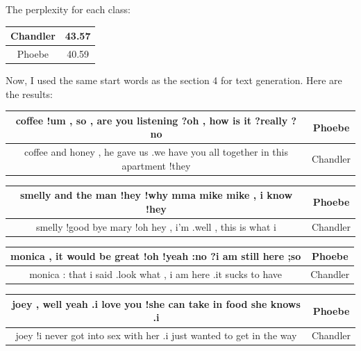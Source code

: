 \documentclass{article}
\begin{document}
\par The perplexity for each class:

\begin{center}
\begin{tabular}{ |c|c| } 
 \hline
 Chandler & 43.57  \\ 
 \hline
 Phoebe & 40.59 \\ 
 \hline
\end{tabular}
\end{center}

\par Now, I used the same start words as the section 4 for text generation. Here are the results:

\begin{center}
\begin{tabular}{ |c|c| } 
 \hline
 coffee !um , so , are you listening ?oh , how is it ?really ?no & Phoebe  \\ 
 \hline
 coffee and honey , he gave us .we have you all  together in this apartment !they & Chandler  \\ 
 \hline
\end{tabular}
\end{center}

\begin{center}
\begin{tabular}{ |c|c| } 
 \hline
 smelly and the man !hey !why mma mike mike , i know !hey & Phoebe  \\ 
 \hline
 smelly !good bye mary !oh hey , i'm .well , this is what i & Chandler  \\ 
 \hline
\end{tabular}
\end{center}


\begin{center}
\begin{tabular}{ |c|c| } 
 \hline
 monica , it would be great !oh !yeah :no ?i am still here ;so & Phoebe  \\ 
 \hline
 monica : that  i said .look what , i am here .it sucks to have & Chandler  \\ 
 \hline
\end{tabular}
\end{center}

\begin{center}
\begin{tabular}{ |c|c| } 
 \hline
 joey , well yeah .i love you !she can take in food she knows .i & Phoebe  \\ 
 \hline
 joey !i never got into sex with her .i just wanted to get in the way & Chandler  \\ 
 \hline
\end{tabular}
\end{center}
\end{document}
